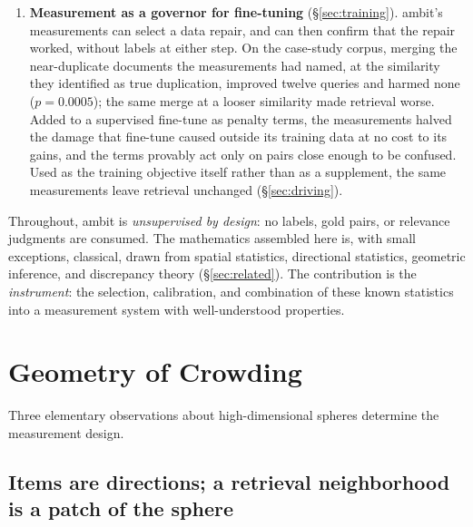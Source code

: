\documentclass[11pt,letterpaper]{article}
\newcommand{\sstar}{\sigma^{*}}
\begin{document}
\begin{enumerate}
collection: all five come out positive on average (one-sided
$p = 0.03$), and a bootstrap over collections and encoders places the
mean prediction quality at AUC $0.60$ with chance excluded
($95\%$ interval $0.54$--$0.67$). All three exceptions are multi-hop questions,
where failure comes from needing a second document rather than from
crowding. The corpus-level $\sstar$ ranks encoders only where the task is
similarity matching. Both boundaries come from measurements rather than
assumptions.
\item \textbf{Measurement as a governor for fine-tuning}
  (\S\ref{sec:training}). \textsf{ambit}'s measurements can select a
  data repair, and can then confirm that the repair worked, without
  labels at either step. On the case-study corpus, merging the
  near-duplicate documents the measurements had named, at the similarity
  they identified as true duplication, improved twelve queries and
  harmed none ($p = 0.0005$); the same merge at a looser similarity made
  retrieval worse. Added to a supervised fine-tune as penalty terms, the
  measurements halved the damage that fine-tune caused outside its
  training data at no cost to its gains, and the terms provably act only
  on pairs close enough to be confused. Used as the training objective
  itself rather than as a supplement, the same measurements leave
  retrieval unchanged (\S\ref{sec:driving}).
\end{enumerate}

Throughout, \textsf{ambit} is \emph{unsupervised by design}: no labels,
gold pairs, or relevance judgments are consumed. The mathematics assembled
here is, with small exceptions, classical, drawn from spatial statistics,
directional statistics, geometric inference, and discrepancy theory
(\S\ref{sec:related}). The contribution is the \emph{instrument}: the
selection, calibration, and combination of these known statistics into a
measurement system with well-understood properties.

\section{Geometry of Crowding}
\label{sec:geometry}

Three elementary observations about high-dimensional spheres determine
the measurement design.

\subsection{Items are directions; a retrieval neighborhood is a patch of
the sphere}
\end{document}

